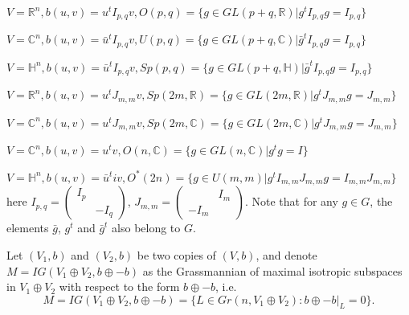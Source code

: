 \documentclass{article}
\begin{document}
\hspace{-2mm}$V=\mathbb{R}^{n}, b(u,v)=u^tI_{p,q}v, O(p,q)=\{g \in GL(p+q,\mathbb{R})| g^tI_{p,q}g=I_{p,q}\}$

\hspace{-2mm}$V=\mathbb{C}^{n}, b(u,v)=\bar{u}^tI_{p,q}v, U(p,q)=\{g \in GL(p+q,\mathbb{C})| \bar{g}^tI_{p,q}g=I_{p,q}\}$

\hspace{-2mm}$V=\mathbb{H}^{n}, b(u,v)=\bar{u}^tI_{p,q}v, Sp(p,q)=\{g \in GL(p+q,\mathbb{H})| \bar{g}^tI_{p,q}g=I_{p,q}\}$

\hspace{-2mm}$V=\mathbb{R}^{n}, b(u,v)=u^tJ_{m,m}v, Sp(2m,\mathbb{R})=\{g \in GL(2m,\mathbb{R})| g^tJ_{m,m}g=J_{m,m}\}$

\hspace{-2mm}$V=\mathbb{C}^{n}, b(u,v)=u^tJ_{m,m}v, Sp(2m,\mathbb{C})=\{g \in GL(2m,\mathbb{C})| g^tJ_{m,m}g=J_{m,m}\}$

\hspace{-2mm}$V=\mathbb{C}^{n}, b(u,v)=u^tv, O(n,\mathbb{C})=\{g \in GL(n,\mathbb{C})| g^tg=I\}$

\hspace{-2mm}$V=\mathbb{H}^{n}, b(u,v)=\bar{u}^tiv, O^*(2n)=\{g \in U(m,m)| g^tI_{m,m}J_{m,m}g=I_{m,m}J_{m,m}\}$
here $I_{p,q}=\left(
\begin{array}{cc}
I_p &  \\
  & -I_q\end{array} \right)$, $J_{m,m}=\left(
\begin{array}{cc}
  &  I_m\\
-I_m  & \end{array} \right)$. Note that for any $g \in G$, the elements  $\bar{g}$, $g^t $ and $\bar{g}^t $ also belong to $G$.

\bigskip

Let $(V_1,b)$ and $(V_2,b)$  be two copies of $(V,b)$, and denote $M=IG(V_1 \oplus V_2, b\oplus-b)$ as the Grassmannian of maximal isotropic subspaces in $V_1 \oplus V_2$ with respect to the form $b\oplus-b$, i.e.
\[
M=IG(V_1 \oplus V_2, b\oplus-b)=\{L \in Gr(n, V_1\oplus V_2): b\oplus-b|_{L}=0\}.
\]
\end{document}
